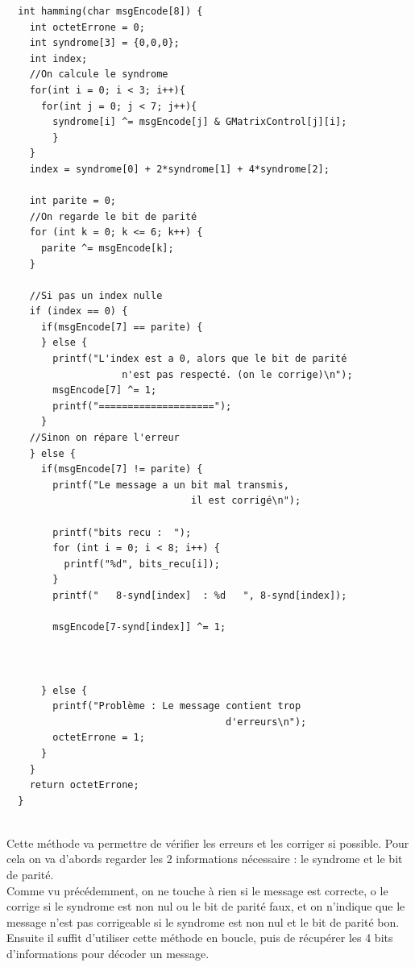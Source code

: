 \documentclass[12pt]{article}
\begin{document}
\begin{verbatim}
  int hamming(char msgEncode[8]) {
    int octetErrone = 0;
    int syndrome[3] = {0,0,0};
    int index;
    //On calcule le syndrome
    for(int i = 0; i < 3; i++){
      for(int j = 0; j < 7; j++){
        syndrome[i] ^= msgEncode[j] & GMatrixControl[j][i];
        }
    }
    index = syndrome[0] + 2*syndrome[1] + 4*syndrome[2];

    int parite = 0;
    //On regarde le bit de parité
    for (int k = 0; k <= 6; k++) {
      parite ^= msgEncode[k];
    }

    //Si pas un index nulle
    if (index == 0) {
      if(msgEncode[7] == parite) {
      } else {
        printf("L'index est a 0, alors que le bit de parité
                    n'est pas respecté. (on le corrige)\n");
        msgEncode[7] ^= 1;
        printf("====================");
      }
    //Sinon on répare l'erreur
    } else {
      if(msgEncode[7] != parite) {
        printf("Le message a un bit mal transmis,
                                il est corrigé\n");

        printf("bits recu :  ");
        for (int i = 0; i < 8; i++) {
          printf("%d", bits_recu[i]);
        }
        printf("   8-synd[index]  : %d   ", 8-synd[index]);

        msgEncode[7-synd[index]] ^= 1;



      } else {
        printf("Problème : Le message contient trop
                                      d'erreurs\n");
        octetErrone = 1;
      }
    }
    return octetErrone;
  }


\end{verbatim}

Cette méthode va permettre de vérifier les erreurs et les corriger si possible. Pour cela on va d’abords regarder les 2 informations nécessaire : le syndrome et le bit de parité.\\
Comme vu précédemment, on ne touche à rien si le message est correcte, o le corrige si le syndrome est non nul ou le bit de parité faux, et on n’indique que le message n’est pas corrigeable si le syndrome est non nul et le bit de parité bon.\\

Ensuite il suffit d’utiliser cette méthode en boucle, puis de récupérer les 4 bits d'informations pour décoder un message.\\
\end{document}

